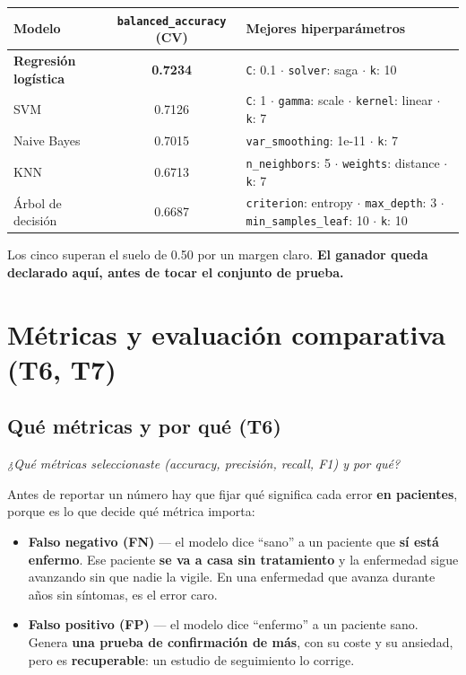 \documentclass[10pt,a4paper]{article}
\begin{document}
\begin{table}[H]
\footnotesize
\begin{tabularx}{\textwidth}{@{}l c X@{}}
\toprule
\textbf{Modelo} & \textbf{\texttt{balanced\_accuracy} (CV)} & \textbf{Mejores hiperparámetros} \\
\midrule
\textbf{Regresión logística} & \textbf{0.7234} & \texttt{C}: 0.1 $\cdot$ \texttt{solver}: saga $\cdot$ \texttt{k}: 10 \\
SVM & 0.7126 & \texttt{C}: 1 $\cdot$ \texttt{gamma}: scale $\cdot$ \texttt{kernel}: linear $\cdot$ \texttt{k}: 7 \\
Naive Bayes & 0.7015 & \texttt{var\_smoothing}: 1e-11 $\cdot$ \texttt{k}: 7 \\
KNN & 0.6713 & \texttt{n\_neighbors}: 5 $\cdot$ \texttt{weights}: distance $\cdot$ \texttt{k}: 7 \\
Árbol de decisión & 0.6687 & \texttt{criterion}: entropy $\cdot$ \texttt{max\_depth}: 3 $\cdot$ \texttt{min\_samples\_leaf}: 10 $\cdot$ \texttt{k}: 10 \\
\bottomrule
\end{tabularx}
\end{table}

Los cinco superan el suelo de 0.50 por un margen claro. \textbf{El ganador queda declarado aquí, antes de tocar el conjunto de prueba.}

\section{Métricas y evaluación comparativa (T6, T7)}

\subsection{Qué métricas y por qué (T6)}

\textit{¿Qué métricas seleccionaste (accuracy, precisión, recall, F1) y por qué?}

Antes de reportar un número hay que fijar qué significa cada error \textbf{en pacientes}, porque es lo que decide qué métrica importa:

\begin{itemize}
\item \textbf{Falso negativo (FN)} --- el modelo dice ``sano'' a un paciente que \textbf{sí está enfermo}. Ese paciente \textbf{se va a casa sin tratamiento} y la enfermedad sigue avanzando sin que nadie la vigile. En una enfermedad que avanza durante años sin síntomas, es el error caro.
\item \textbf{Falso positivo (FP)} --- el modelo dice ``enfermo'' a un paciente sano. Genera \textbf{una prueba de confirmación de más}, con su coste y su ansiedad, pero es \textbf{recuperable}: un estudio de seguimiento lo corrige.
\end{itemize}
\end{document}
